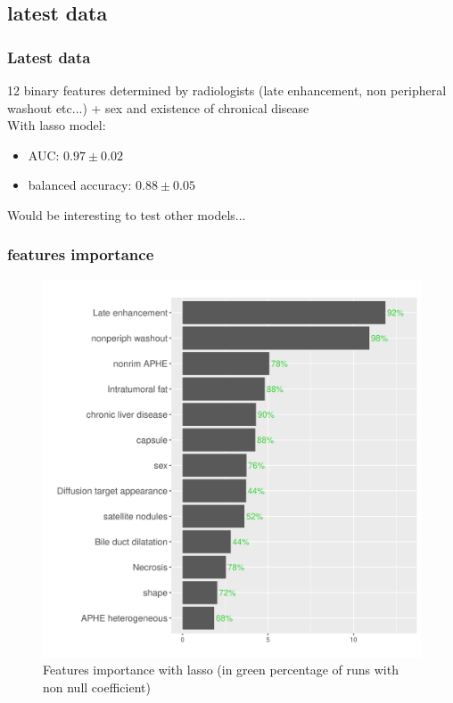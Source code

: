 \documentclass{beamer}
\begin{document}
\subsection{latest data}

\begin{frame}
    \frametitle{Latest data}
    12 binary features determined by radiologists (late enhancement, non peripheral washout etc...) + sex and existence of chronical disease\\[10 pt]
    With lasso model:
    \begin{itemize}
        \item AUC: $0.97 \pm 0.02$\\[10 pt]
        \item balanced accuracy: $0.88 \pm 0.05$
        \end{itemize}
    Would be interesting to test other models...
\end{frame}

\begin{frame}
    \frametitle{features importance}
    \begin{figure}
        \centering
        \includegraphics[scale = 0.38]{images/barplot_final.png}
        \caption{Features importance with lasso (in green percentage of runs with non null coefficient)}
    \end{figure}
\end{frame}
\end{document}
